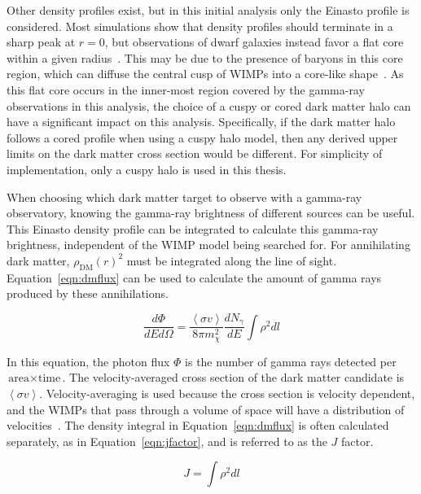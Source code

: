     Other density profiles exist, but in this initial analysis only the Einasto profile is considered.
    Most simulations show that density profiles should terminate in a sharp peak at $r=0$, but observations of dwarf galaxies instead favor a flat core within a given radius~\cite{flores1994observational,CoreVsCusp}.
    This may be due to the presence of baryons in this core region, which can diffuse the central cusp of WIMPs into a core-like shape~\cite{corecusp_baryondiffuse1,corecusp_baryondiffuse2}.
    As this flat core occurs in the inner-most region covered by the gamma-ray observations in this analysis, the choice of a cuspy or cored dark matter halo can have a significant impact on this analysis.
    Specifically, if the dark matter halo follows a cored profile when using a cuspy halo model, then any derived upper limits on the dark matter cross section would be different.
    For simplicity of implementation, only a cuspy halo is used in this thesis.
    
    When choosing which dark matter target to observe with a gamma-ray observatory, knowing the gamma-ray brightness of different sources can be useful.
    This Einasto density profile can be integrated to calculate this gamma-ray brightness, independent of the WIMP model being searched for.
    For annihilating dark matter, $\rho_{\textrm{DM}}\left(r\right)^2$ must be integrated along the line of sight.
    Equation~\ref{eqn:dmflux} can be used to calculate the amount of gamma rays produced by these annihilations.
    
    \begin{equation}\label{eqn:dmflux}
      \frac{ d\Phi }{ dE d \Omega } = \frac{ \left \langle \sigma v \right \rangle }{8 \pi m_\chi^2} \frac{dN_{\gamma}}{dE} \int \rho^2 dl
    \end{equation}
    
    In this equation, the photon flux $\Phi$ is the number of gamma rays detected per $\textrm{area}\times\textrm{time}$.
    The velocity-averaged cross section of the dark matter candidate is $\left \langle \sigma v \right \rangle$.
    Velocity-averaging is used because the cross section is velocity dependent, and the WIMPs that pass through a volume of space will have a distribution of velocities~\cite{wimp_veldist}.
    The density integral in Equation~\ref{eqn:dmflux} is often calculated separately, as in Equation~\ref{eqn:jfactor}, and is referred to as the $J$ factor.

    \begin{equation}\label{eqn:jfactor}
      J = \int \rho^2 dl
    \end{equation}

